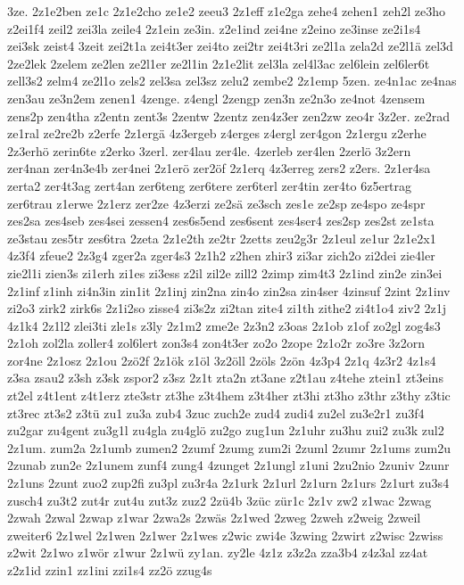 {3ze.
2z1e2ben
ze1c
2z1e2cho
ze1e2
zeeu3
2z1eff
z1e2ga
zehe4
zehen1
zeh2l
ze3ho
z2ei1f4
zeil2
zei3la
zeile4
2z1ein
ze3in.
z2e1ind
zei4ne
z2eino
ze3inse
ze2i1s4
zei3sk
zeist4
3zeit
zei2t1a
zei4t3er
zei4to
zei2tr
zei4t3ri
ze2l1a
zela2d
ze2l1ä
zel3d
2ze2lek
2zelem
ze2len
ze2l1er
ze2l1in
2z1e2lit
zel3la
zel4l3ac
zel6lein
zel6ler6t
zell3s2
zelm4
ze2l1o
zels2
zel3sa
zel3sz
zelu2
zembe2
2z1emp
5zen.
ze4n1ac
ze4nas
zen3au
ze3n2em
zenen1
4zenge.
z4engl
2zengp
zen3n
ze2n3o
ze4not
4zensem
zens2p
zen4tha
z2entn
zent3s
2zentw
2zentz
zen4z3er
zen2zw
zeo4r
3z2er.
ze2rad
ze1ral
ze2re2b
z2erfe
2z1ergä
4z3ergeb
z4erges
z4ergl
zer4gon
2z1ergu
z2erhe
2z3erhö
zerin6te
z2erko
3zerl.
zer4lau
zer4le.
4zerleb
zer4len
2zerlö
3z2ern
zer4nan
zer4n3e4b
zer4nei
2z1erö
zer2öf
2z1erq
4z3erreg
zers2
z2ers.
2z1er4sa
zerta2
zer4t3ag
zert4an
zer6teng
zer6tere
zer6terl
zer4tin
zer4to
6z5ertrag
zer6trau
z1erwe
2z1erz
zer2ze
4z3erzi
ze2sä
ze3sch
zes1e
ze2sp
ze4spo
ze4spr
zes2sa
zes4seb
zes4sei
zessen4
zes6s5end
zes6sent
zes4ser4
zes2sp
zes2st
ze1sta
ze3stau
zes5tr
zes6tra
2zeta
2z1e2th
ze2tr
2zetts
zeu2g3r
2z1eul
ze1ur
2z1e2x1
4z3f4
zfeue2
2z3g4
zger2a
zger4s3
2z1h2
z2hen
zhir3
zi3ar
zich2o
zi2dei
zie4ler
zie2l1i
zien3s
zi1erh
zi1es
zi3ess
z2il
zil2e
zill2
2zimp
zim4t3
2z1ind
zin2e
zin3ei
2z1inf
z1inh
zi4n3in
zin1it
2z1inj
zin2na
zin4o
zin2sa
zin4ser
4zinsuf
2zint
2z1inv
zi2o3
zirk2
zirk6s
2z1i2so
zisse4
zi3s2z
zi2tan
zite4
zi1th
zithe2
zi4t1o4
ziv2
2z1j
4z1k4
2z1l2
zlei3ti
zle1s
z3ly
2z1m2
zme2e
2z3n2
z3oas
2z1ob
z1of
zo2gl
zog4s3
2z1oh
zol2la
zoller4
zol6lert
zon3s4
zon4t3er
zo2o
2zope
2z1o2r
zo3re
3z2orn
zor4ne
2z1osz
2z1ou
2zö2f
2z1ök
z1öl
3z2öll
2zöls
2zön
4z3p4
2z1q
4z3r2
4z1s4
z3sa
zsau2
z3sh
z3sk
zspor2
z3sz
2z1t
zta2n
zt3ane
z2t1au
z4tehe
ztein1
zt3eins
zt2el
z4t1ent
z4t1erz
zte3str
zt3he
z3t4hem
z3t4her
zt3hi
zt3ho
z3thr
z3thy
z3tic
zt3rec
zt3s2
z3tü
zu1
zu3a
zub4
3zuc
zuch2e
zud4
zudi4
zu2el
zu3e2r1
zu3f4
zu2gar
zu4gent
zu3g1l
zu4gla
zu4glö
zu2go
zug1un
2z1uhr
zu3hu
zui2
zu3k
zul2
2z1um.
zum2a
2z1umb
zumen2
2zumf
2zumg
zum2i
2zuml
2zumr
2z1ums
zum2u
2zunab
zun2e
2z1unem
zunf4
zung4
4zunget
2z1ungl
z1uni
2zu2nio
2zuniv
2zunr
2z1uns
2zunt
zuo2
zup2fi
zu3pl
zu3r4a
2z1urk
2z1url
2z1urn
2z1urs
2z1urt
zu3s4
zusch4
zu3t2
zut4r
zut4u
zut3z
zuz2
2zü4b
3züc
zür1c
2z1v
zw2
z1wac
2zwag
2zwah
2zwal
2zwap
z1war
2zwa2s
2zwäs
2z1wed
2zweg
2zweh
z2weig
2zweil
zweiter6
2z1wel
2z1wen
2z1wer
2z1wes
z2wic
zwi4e
3zwing
2zwirt
z2wisc
2zwiss
z2wit
2z1wo
z1wör
z1wur
2z1wü
zy1an.
zy2le
4z1z
z3z2a
zza3b4
z4z3al
zz4at
z2z1id
zzin1
zz1ini
zzi1s4
zz2ö
zzug4s
}

\endinput

